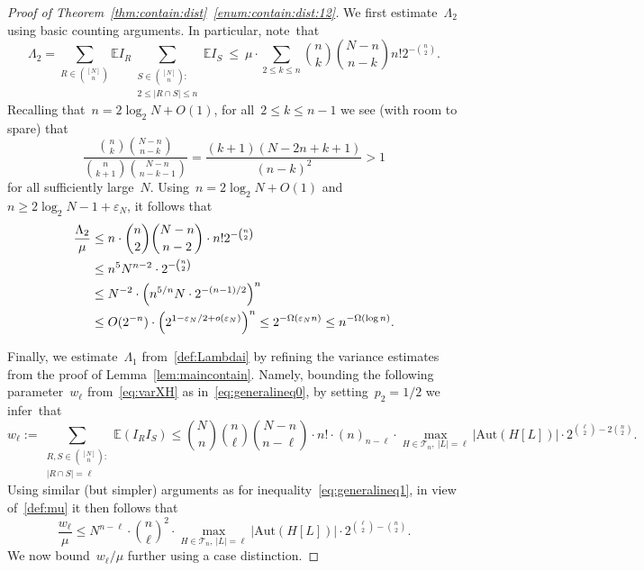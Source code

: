 \documentclass{article}
\newcommand{\eps}{\varepsilon}
\newcommand{\E}{\mathbb{E}}
\newcommand{\cT}{\mathcal{T}}
\newcommand\abs[1]{\left|#1\right|}
\newcommand{\Aut}{\mathrm{Aut}}
\newcommand{\w}{w}
\newcommand\Bigpar[1]{\Bigl(#1\Bigr)}
\newcommand{\refT}[1]{Theorem~\ref{#1}}
\begin{document}
\begin{proof}[Proof of \refT{thm:contain:dist}~\ref{enum:contain:dist:12}]
We first estimate~$\Lambda_2$ using basic counting arguments. 
In particular, note~that
\begin{equation*}
\label{eq:RStoS}
\Lambda_2 = \sum_{R \in \binom{[N]}{n}}\E I_R \sum_{\substack{S \in \binom{[N]}{n}:\\ 2 \le |R \cap S| \le n}} \E I_S 
\: \le \: \mu \cdot \sum_{2 \le k \le n} \binom{n}{k}\binom{N-n}{n-k} n!2^{-\binom{n}{2}}.
\end{equation*}
Recalling that~$n=2\log_2 N + O(1)$, 
for all~$2 \le k \leq n-1$ we see (with room to spare) that 
\[
\frac{\binom{n}{k}\binom{N-n}{n-k}}{\binom{n}{k+1}\binom{N-n}{n-k-1}}
= \frac{(k+1)(N-2n+k+1)}{(n-k)^2} > 1
\]
for all sufficiently large~$N$. 
Using~$n = 2\log_2 N + O(1)$ and~$n \geq 2\log_2N -1 +\eps_N$, it follows that
\begin{align*}
\frac{\Lambda_2}{\mu}
& \leq n \cdot \binom{n}{2}\binom{N-n}{n-2} \cdot n!2^{-\binom{n}{2}} \\
& \leq n^5 N^{n-2}  \cdot 2^{-\binom{n}{2}} \\
& \leq N^{-2} \cdot \Bigpar{n^{5/n} N  \cdot 2^{-(n-1)/2}}^n\\
& \leq O(2^{-n}) \cdot \Bigpar{2^{1-\eps_N/2 + o(\eps_N)}}^n\le 2^{-\Omega(\eps_Nn)} \leq n^{-\Omega(\log n)}. 
\end{align*}

Finally, we estimate~$\Lambda_1$ from~\eqref{def:Lambdai} 
by refining the variance estimates from the proof of Lemma~\ref{lem:maincontain}. 
Namely, bounding the following parameter~$\w_\ell$ from~\eqref{eq:varXH} as in~\eqref{eq:generalineq0}, 
by setting~$p_2=1/2$ we infer~that
\[
\w_\ell := \sum_{\substack{R,S \in \binom{[N]}{n}:\\ |R \cap S| =\ell}}\E(I_R I_S)
\leq \binom{N}{n}\binom{n}{\ell}\binom{N-n}{n-\ell} \cdot n! \cdot (n)_{n-\ell} \cdot \max_{H\in \cT_n,  \: \abs{L}=\ell} |\Aut(H[L])| \cdot 2^{\binom{\ell}{2}-2\binom{n}{2}} .\]
Using similar (but simpler) arguments as for inequality~\eqref{eq:generalineq1}, in view of~\eqref{def:mu} it then follows that 
\begin{equation}\label{eq:well:12}
\frac{w_\ell}{\mu} \leq N^{n-\ell} \cdot \binom{n}{\ell}^2 \cdot \max_{H \in\cT_n,  \: \abs{L}=\ell} \abs{\Aut(H[L])} \cdot 2^{\binom{\ell}{2}-\binom{n}{2}} .
\end{equation}
We now bound~$\w_\ell/\mu$ further using a case distinction.


\end{proof}
\end{document}
